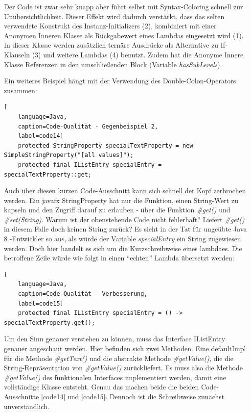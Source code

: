 Der Code ist zwar sehr knapp aber führt selbst mit Syntax-Coloring schnell zur Unübersichtlichkeit. Dieser Effekt wird dadurch verstärkt, dass das selten verwendete Konstrukt des Instanz-Initializers (2), kombiniert mit einer Anonymen Inneren Klasse als Rückgabewert eines Lambdas eingesetzt wird (1). In dieser Klasse werden zusätzlich ternäre Ausdrücke als Alternative zu If-Klauseln (3) und weitere Lambdas (4) benutzt. Zudem hat die Anonyme Innere Klasse Referenzen in den umschließenden Block (Variable \textit{hasSubLevels}).

Ein weiteres Beispiel hängt mit der Verwendung des Double-Colon-Operators zusammen:

\begin{lstlisting}[
    language=Java,
    caption=Code-Qualität - Gegenbeispiel 2,
    label=code14]
	protected StringProperty specialTextProperty = new SimpleStringProperty("[all values]");
	protected final IListEntry specialEntry = specialTextProperty::get;
\end{lstlisting}

Auch über diesen kurzen Code-Ausschnitt kann sich schnell der Kopf zerbrochen werden. Ein \gls{javafx} StringProperty hat nur die Funktion, einen String-Wert zu kapseln und den Zugriff darauf zu erlauben - über die Funktion \textit{\#get()} und \textit{\#set(String)}. Warum ist der obenstehende Code nicht fehlerhaft? Liefert \textit{\#get()} in diesem Falle doch keinen String zurück?
Es sieht in der Tat für ungeübte Java 8 -Entwickler so aus, als würde der Variable \textit{specialEntry} ein String zugewiesen werden. Doch hier handelt es sich um die Kurzschreibweise eines \gls{lambda}es. Die betroffene Zeile würde wie folgt in einen \enquote{echten} Lambda übersetzt werden:

\begin{lstlisting}[
    language=Java,
    caption=Code-Qualität - Verbesserung,
    label=code15]
	protected final IListEntry specialEntry = () -> specialTextProperty.get();
\end{lstlisting}

Um den Sinn genauer verstehen zu können, muss das Interface IListEntry genauer angeschaut werden. Hier befinden sich zwei Methoden. Eine \gls{defaultImpl} für die Methode \textit{\#getText()} und die abstrakte Methode \textit{\#getValue()}, die die String-Repräsentation von \textit{\#getValue()} zurückliefert. Es muss also die Methode \textit{\#getValue()} des funktionalen Interfaces implementiert werden, damit eine vollständige Klasse entsteht. Genau das machen beide die beiden Code-Ausschnitte \ref{code14} und \ref{code15}. Dennoch ist die Schreibweise zunächst unverständlich.

